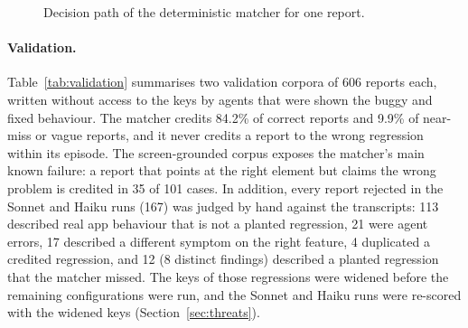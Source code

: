 \documentclass[sigconf]{acmart}
\begin{document}
\begin{figure}[t]
  \centering
  \caption{Decision path of the deterministic matcher for one report.}
  \label{fig:grading}
\end{figure}

\paragraph{Validation.}
Table~\ref{tab:validation} summarises two validation corpora of 606 reports each, written without
access to the keys by agents that were shown the buggy and fixed behaviour. The matcher credits
84.2\% of correct reports and 9.9\% of near-miss or vague reports, and it never credits a report to
the wrong regression within its episode. The screen-grounded corpus exposes the matcher's main known
failure: a report that points at the right element but claims the wrong problem is credited in 35 of
101 cases. In addition, every report rejected in the Sonnet and Haiku runs (167) was judged by hand
against the transcripts: 113 described real app behaviour that is not a planted regression, 21 were
agent errors, 17 described a different symptom on the right feature, 4 duplicated a credited
regression, and 12 (8 distinct findings) described a planted regression that the matcher missed. The
keys of those regressions were widened before the remaining configurations were run, and the Sonnet
and Haiku runs were re-scored with the widened keys (Section~\ref{sec:threats}).
\end{document}
